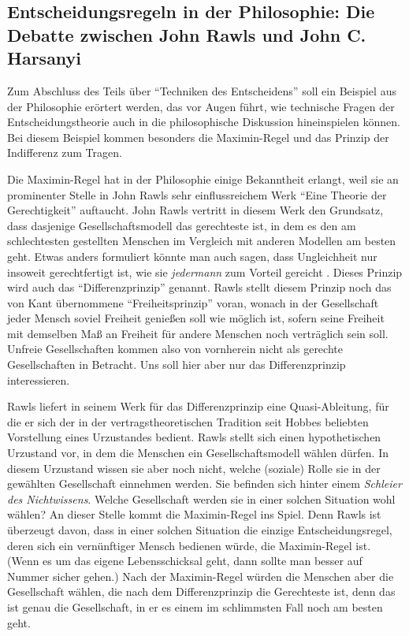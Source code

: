 \subsection{Entscheidungsregeln in der Philosophie: Die Debatte zwischen John
Rawls und John C. Harsanyi}
\label{RawlsHarsanyiDebatte}

Zum Abschluss des Teils über "`Techniken des Entscheidens"' soll ein Beispiel aus
der Philosophie erörtert werden, das vor Augen führt, wie technische Fragen der
Entscheidungstheorie auch in die philosophische Diskussion hineinspielen können. 
Bei diesem Beispiel kommen besonders die Maximin-Regel und das Prinzip der
Indifferenz zum Tragen.

 Die Maximin-Regel hat in der Philosophie einige
Bekanntheit erlangt, weil sie an prominenter Stelle in John Rawls sehr
einflussreichem Werk "`Eine Theorie der Gerechtigkeit"' auftaucht. John Rawls
vertritt in diesem Werk den Grundsatz, dass dasjenige Gesellschaftsmodell das
gerechteste ist, in dem es den am schlechtesten gestellten Menschen im Vergleich
mit anderen Modellen am besten geht. Etwas anders formuliert könnte man auch
sagen, dass Ungleichheit nur insoweit gerechtfertigt ist, wie sie {\em jedermann}
zum Vorteil gereicht \cite[S. 96ff.]{rawls:1971}. Dieses Prinzip wird auch das "`Differenzprinzip"' genannt.
Rawls stellt diesem Prinzip noch das von Kant übernommene "`Freiheitsprinzip"'
voran, wonach in der Gesellschaft jeder Mensch soviel Freiheit genießen soll wie
möglich ist, sofern seine Freiheit mit demselben Maß an Freiheit für
andere Menschen noch verträglich sein soll. Unfreie Gesellschaften kommen also
von vornherein nicht als gerechte Gesellschaften in Betracht. Uns soll hier aber
nur das Differenzprinzip interessieren.

Rawls liefert in seinem Werk für das Differenz\-prinzip eine
Quasi-\-Ab\-leit\-ung, für die er sich der in der vertragstheoretischen
Tradition seit Hobbes beliebten Vorstellung eines Urzustandes bedient. Rawls
stellt sich einen hypothetischen Urzustand vor, in dem die Menschen ein
Gesellschaftsmodell wählen dürfen. In diesem Urzustand wissen sie aber noch
nicht, welche (soziale) Rolle sie in der gewählten Gesellschaft einnehmen werden.
Sie befinden sich hinter einem {\em Schleier des Nichtwissens}. Welche
Gesellschaft werden sie in einer solchen Situation wohl wählen? An dieser Stelle
kommt die Maximin-Regel ins Spiel. Denn Rawls ist überzeugt davon, dass in einer
solchen Situation die einzige Entscheidungsregel, deren sich ein vernünftiger
Mensch bedienen würde, die Maximin-Regel ist. (Wenn es um das eigene
Lebensschicksal geht, dann sollte man besser auf Nummer sicher gehen.) Nach der
Maximin-Regel würden die Menschen aber die Gesellschaft wählen, die nach dem
Differenzprinzip die Gerechteste ist, denn das ist genau die Gesellschaft, in er
es einem im schlimmsten Fall noch am besten geht.


